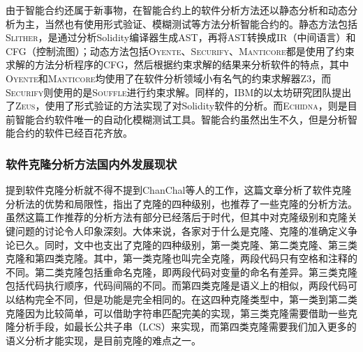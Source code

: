 由于智能合约还属于新事物，在智能合约上的软件分析方法还以静态分析和动态分析为主，当然也有使用形式验证、模糊测试等方法分析智能合约的。静态方法包括\textsc{Slither}\cite{slither}，是通过分析Solidity编译器生成AST，再将AST转换成IR（中间语言）和CFG（控制流图）；动态方法包括\textsc{Oyente}\cite{oyente}、\textsc{Securify}\cite{securify}、\textsc{Manticore}\cite{manticore}都是使用了约束求解的方法分析程序的CFG，然后根据约束求解的结果来分析软件的特点，其中\textsc{Oyente}和\textsc{Manticore}均使用了在软件分析领域小有名气的约束求解器Z3\cite{z3}，而\textsc{Securify}则使用的是\textsc{Souffle}\cite{souffle}进行约束求解。同样的，IBM的以太坊研究团队提出了\textsc{Zeus}\cite{zeus}，使用了形式验证的方法实现了对Solidity软件的分析。而\textsc{Echidna}\cite{echidna}，则是目前智能合约软件唯一的自动化模糊测试工具。智能合约虽然出生不久，但是分析智能合约的软件已经百花齐放。

%

\subsubsection{软件克隆分析方法国内外发展现状}\label{sec:clone_intro}
提到软件克隆分析就不得不提到ChanChal等人的工作\cite{survey-on-clone}，这篇文章分析了软件克隆分析法的优势和局限性，指出了克隆的四种级别，也推荐了一些克隆的分析方法。虽然这篇工作推荐的分析方法有部分已经落后于时代，但其中对克隆级别和克隆关键问题的讨论令人印象深刻。大体来说，各家对于什么是克隆、克隆的准确定义争论已久。同时，文中也支出了克隆的四种级别，第一类克隆、第二类克隆、第三类克隆和第四类克隆。其中，第一类克隆也叫完全克隆，两段代码只有空格和注释的不同。第二类克隆包括重命名克隆，即两段代码对变量的命名有差异。第三类克隆包括代码执行顺序，代码间隔的不同。而第四类克隆是语义上的相似，两段代码可以结构完全不同，但是功能是完全相同的。在这四种克隆类型中，第一类到第二类克隆因为比较简单，可以借助字符串匹配完美的实现，第三类克隆需要借助一些克隆分析手段，如最长公共子串（LCS）来实现，而第四类克隆需要我们加入更多的语义分析才能实现，是目前克隆的难点之一。

